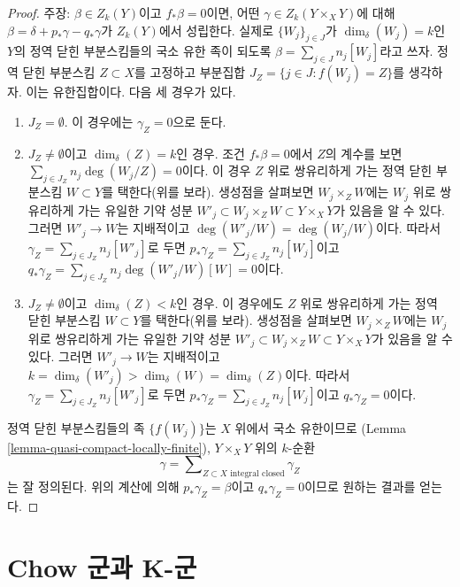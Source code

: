 \begin{proof}
\medskip\noindent
주장: $\beta \in Z_k(Y)$이고 $f_*\beta = 0$이면, 어떤
$\gamma \in Z_k(Y \times_X Y)$에 대해
$\beta = \delta + p_*\gamma - q_*\gamma$가 $Z_k(Y)$에서 성립한다.
실제로 $\{W_j\}_{j \in J}$가 $\dim_\delta(W_j) = k$인 $Y$의 정역
닫힌 부분스킴들의 국소 유한 족이 되도록
$\beta = \sum_{j \in J} n_j[W_j]$라고 쓰자. 정역 닫힌 부분스킴
$Z \subset X$를 고정하고 부분집합
$J_Z = \{j \in J : f(W_j) = Z\}$를 생각하자. 이는 유한집합이다.
다음 세 경우가 있다.
\begin{enumerate}
\item $J_Z = \emptyset$. 이 경우에는 $\gamma_Z = 0$으로 둔다.
\item $J_Z \not = \emptyset$이고 $\dim_\delta(Z) = k$인 경우.
조건 $f_*\beta = 0$에서 $Z$의 계수를 보면
$\sum_{j \in J_Z} n_j\deg(W_j/Z) = 0$이다. 이 경우 $Z$ 위로 쌍유리하게
가는 정역 닫힌 부분스킴 $W \subset Y$를 택한다(위를 보라). 생성점을
살펴보면 $W_j \times_Z W$에는 $W_j$ 위로 쌍유리하게 가는 유일한
기약 성분
$W'_j \subset W_j \times_Z W \subset Y \times_X Y$가 있음을 알 수 있다.
그러면 $W'_j \to W$는 지배적이고
$\deg(W'_j/W) = \deg(W_j/W)$이다. 따라서
$\gamma_Z = \sum_{j \in J_Z} n_j[W'_j]$로 두면
$p_*\gamma_Z = \sum_{j \in J_Z} n_j[W_j]$이고
$q_*\gamma_Z = \sum_{j \in J_Z} n_j\deg(W'_j/W)[W] = 0$이다.
\item $J_Z \not = \emptyset$이고 $\dim_\delta(Z) < k$인 경우.
이 경우에도 $Z$ 위로 쌍유리하게 가는 정역 닫힌 부분스킴
$W \subset Y$를 택한다(위를 보라). 생성점을 살펴보면
$W_j \times_Z W$에는 $W_j$ 위로 쌍유리하게 가는 유일한 기약 성분
$W'_j \subset W_j \times_Z W \subset Y \times_X Y$가 있음을 알 수 있다.
그러면 $W'_j \to W$는 지배적이고
$k = \dim_\delta(W'_j) > \dim_\delta(W) = \dim_\delta(Z)$이다. 따라서
$\gamma_Z = \sum_{j \in J_Z} n_j[W'_j]$로 두면
$p_*\gamma_Z = \sum_{j \in J_Z} n_j[W_j]$이고
$q_*\gamma_Z = 0$이다.
\end{enumerate}
정역 닫힌 부분스킴들의 족 $\{f(W_j)\}$는 $X$ 위에서 국소 유한이므로
(Lemma \ref{lemma-quasi-compact-locally-finite}),
$Y \times_X Y$ 위의 $k$-순환
$$
\gamma = \sum\nolimits_{Z \subset X\text{ integral closed}} \gamma_Z
$$
는 잘 정의된다. 위의 계산에 의해
$p_*\gamma_Z = \beta$이고 $q_*\gamma_Z = 0$이므로 원하는 결과를 얻는다.
\end{proof}













\section{Chow 군과 K-군}
\label{section-chow-and-K}


